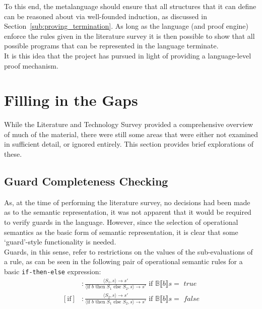 To this end, the metalanguage should ensure that all structures that it can define can be reasoned about via well-founded induction, as discussed in Section~\ref{sub:proving_termination}. 
As long as the language (and proof engine) enforce the rules given in the literature survey it is then possible to show that all possible programs that can be represented in the language terminate.\\

It is this idea that the project has pursued in light of providing a language-level proof mechanism. 




\section{Filling in the Gaps} %
\label{sec:filling_in_the_gaps}
While the Literature and Technology Survey provided a comprehensive overview of much of the material, there were still some areas that were either not examined in sufficient detail, or ignored entirely. 
This section provides brief explorations of these.

\subsection{Guard Completeness Checking} %
\label{sub:guard_completeness_checking}
As, at the time of performing the literature survey, no decisions had been made as to the semantic representation, it was not apparent that it would be required to verify guards in the language.
However, since the selection of operational semantics as the basic form of semantic representation, it is clear that some `guard'-style functionality is needed. \\

Guards, in this sense, refer to restrictions on the values of the sub-evaluations of a rule, as can be seen in the following pair of operational semantic rules for a basic \texttt{if-then-else} expression:
\begin{align}
    [\text{if}] &: \frac{\langle S_1, s \rangle \to s'}{\langle \text{if } b \text{ then } S_1 \text{ else } S_2, s\rangle \to s'} \text{ if } \mathbb{B}\llbracket b \rrbracket s = \textit{ true} \\
    [\text{if}] &: \frac{\langle S_2, s \rangle \to s'}{\langle \text{if } b \text{ then } S_1 \text{ else } S_2, s\rangle \to s'} \text{ if } \mathbb{B}\llbracket b \rrbracket s = \textit{ false}
\end{align}

